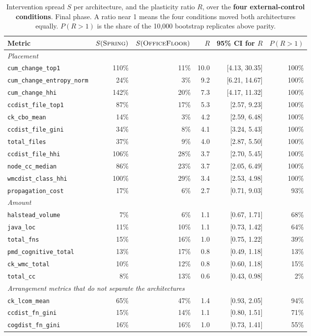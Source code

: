 \documentclass[11pt,a4paper]{article}
\newcommand{\sprg}{\textsc{Spring}}
\newcommand{\offl}{\textsc{OfficeFloor}}
\begin{document}
\begin{table}[t]
\centering
\caption{Intervention spread $S$ per architecture, and the plasticity ratio
$R$, over the \textbf{four external-control conditions}. Final phase. A ratio
near 1 means the four conditions moved both architectures equally. $P(R>1)$ is
the share of the 10{,}000 bootstrap replicates above parity.}
\label{tab:spread}
\small
\begin{tabular}{lrrrrr}
\toprule
Metric & $S(\sprg{})$ & $S(\offl{})$ & $R$ & 95\% CI for $R$ & $P(R>1)$ \\
\midrule
\multicolumn{6}{l}{\emph{Placement}}\\
\texttt{cum\_change\_top1} & 110\% & 11\% & 10.0 & [4.13, 30.35] & 100\% \\
\texttt{cum\_change\_entropy\_norm} & 24\% & 3\% & 9.2 & [6.21, 14.67] & 100\% \\
\texttt{cum\_change\_hhi} & 142\% & 20\% & 7.3 & [4.17, 11.32] & 100\% \\
\texttt{ccdist\_file\_top1} & 87\% & 17\% & 5.3 & [2.57, 9.23] & 100\% \\
\texttt{ck\_cbo\_mean} & 14\% & 3\% & 4.2 & [2.59, 6.48] & 100\% \\
\texttt{ccdist\_file\_gini} & 34\% & 8\% & 4.1 & [3.24, 5.43] & 100\% \\
\texttt{total\_files} & 37\% & 9\% & 4.0 & [2.87, 5.50] & 100\% \\
\texttt{ccdist\_file\_hhi} & 106\% & 28\% & 3.7 & [2.70, 5.45] & 100\% \\
\texttt{node\_cc\_median} & 86\% & 23\% & 3.7 & [2.05, 6.49] & 100\% \\
\texttt{wmcdist\_class\_hhi} & 100\% & 29\% & 3.4 & [2.53, 4.98] & 100\% \\
\texttt{propagation\_cost} & 17\% & 6\% & 2.7 & [0.71, 9.03] & 93\% \\
\midrule
\multicolumn{6}{l}{\emph{Amount}}\\
\texttt{halstead\_volume} & 7\% & 6\% & 1.1 & [0.67, 1.71] & 68\% \\
\texttt{java\_loc} & 11\% & 10\% & 1.1 & [0.73, 1.42] & 64\% \\
\texttt{total\_fns} & 15\% & 16\% & 1.0 & [0.75, 1.22] & 39\% \\
\texttt{pmd\_cognitive\_total} & 13\% & 17\% & 0.8 & [0.49, 1.18] & 13\% \\
\texttt{ck\_wmc\_total} & 10\% & 12\% & 0.8 & [0.60, 1.18] & 15\% \\
\texttt{total\_cc} & 8\% & 13\% & 0.6 & [0.43, 0.98] & 2\% \\
\midrule
\multicolumn{6}{l}{\emph{Arrangement metrics that do not separate the architectures}}\\
\texttt{ck\_lcom\_mean} & 65\% & 47\% & 1.4 & [0.93, 2.05] & 94\% \\
\texttt{ccdist\_fn\_gini} & 15\% & 14\% & 1.1 & [0.80, 1.51] & 71\% \\
\texttt{cogdist\_fn\_gini} & 16\% & 16\% & 1.0 & [0.73, 1.41] & 55\% \\
\bottomrule
\end{tabular}
\end{table}
\end{document}
